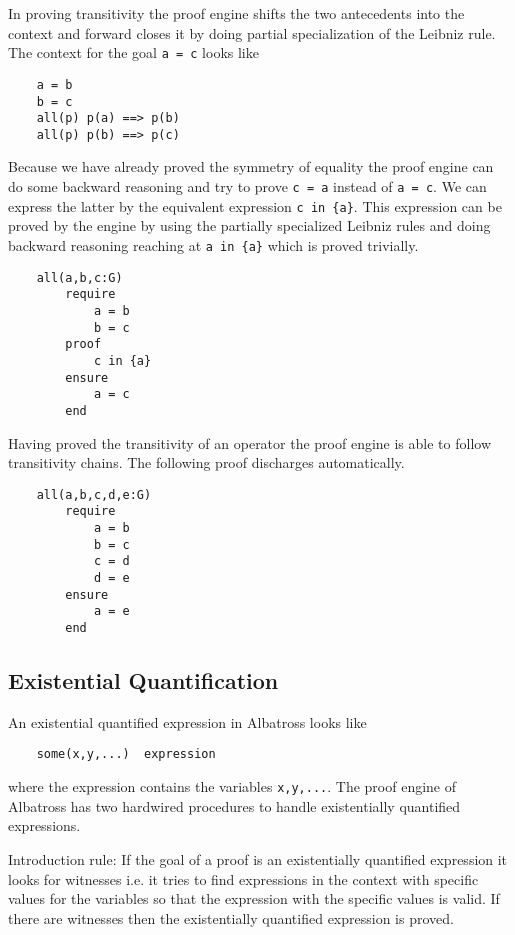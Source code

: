 In proving transitivity the proof engine shifts the two antecedents into the
context and forward closes it by doing partial specialization of the Leibniz
rule. The context for the goal \lstinline!a = c! looks like
\begin{lstlisting}
    a = b
    b = c
    all(p) p(a) ==> p(b)
    all(p) p(b) ==> p(c)
\end{lstlisting}
Because we have already proved the symmetry of equality the proof engine can
do some backward reasoning and try to prove \lstinline!c = a! instead of
\lstinline!a = c!. We can express the latter by the equivalent expression
\lstinline!c in {a}!. This expression can be proved by the engine by using the
partially specialized Leibniz rules and doing backward reasoning reaching at
\lstinline!a in {a}! which is proved trivially.

\begin{lstlisting}
    all(a,b,c:G)
        require
            a = b
            b = c
        proof
            c in {a}
        ensure
            a = c
        end
\end{lstlisting}

Having proved the transitivity of an operator the proof engine is able to follow
transitivity chains. The following proof discharges automatically.

\begin{lstlisting}
    all(a,b,c,d,e:G)
        require
            a = b
            b = c
            c = d
            d = e
        ensure
            a = e
        end
\end{lstlisting}



\subsection{Existential Quantification}

An existential quantified expression in Albatross looks like
\begin{lstlisting}
    some(x,y,...)  expression
\end{lstlisting}
where the expression contains the variables \lstinline!x,y,...!. The proof
engine of Albatross has two hardwired procedures to handle existentially
quantified expressions.

Introduction rule: If the goal of a proof is an existentially quantified
expression it looks for witnesses i.e. it tries to find expressions in the
context with specific values for the variables so that the expression with the
specific values is valid. If there are witnesses then the existentially
quantified expression is proved.


